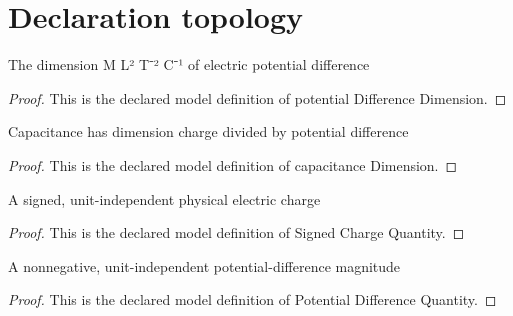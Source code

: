 \section{Declaration topology}
\begin{definition}
  \label{def:physics:phyx-mini-0873:phyxminiproblems-problemphyxmini0873-potentialdifferencedimension}
  The dimension M L² T⁻² C⁻¹ of electric potential difference
\end{definition}
\begin{proof}
  This is the declared model definition of potential Difference Dimension.
\end{proof}
\begin{definition}
  \label{def:physics:phyx-mini-0873:phyxminiproblems-problemphyxmini0873-capacitancedimension}
  Capacitance has dimension charge divided by potential difference
\end{definition}
\begin{proof}
  This is the declared model definition of capacitance Dimension.
\end{proof}
\begin{definition}
  \label{def:physics:phyx-mini-0873:phyxminiproblems-problemphyxmini0873-signedchargequantity}
  A signed, unit-independent physical electric charge
\end{definition}
\begin{proof}
  This is the declared model definition of Signed Charge Quantity.
\end{proof}
\begin{definition}
  \label{def:physics:phyx-mini-0873:phyxminiproblems-problemphyxmini0873-potentialdifferencequantity}
  A nonnegative, unit-independent potential-difference magnitude
\end{definition}
\begin{proof}
  This is the declared model definition of Potential Difference Quantity.
\end{proof}
